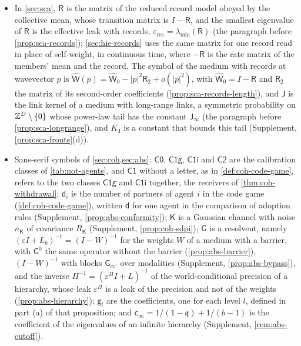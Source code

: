 \begin{itemize}
\item In \cref{sec:sca}, $\mathsf R$ is the matrix of the reduced record model obeyed by the collective mean, whose transition matrix is $I-\mathsf R$, and the smallest eigenvalue of $\mathsf R$ is the effective leak with records, $\varepsilon_{\mathrm{rec}}=\lambda_{\min}(\mathsf R)$ (the paragraph before \cref{prop:sca-records}); \cref{sec:hie-records} uses the same matrix for one record read in place of self-weight, in continuous time, where $-\mathsf R$ is the rate matrix of the members' mean and the record. The symbol of the medium with records at wavevector $p$ is $\hat{\mathsf W}(p)=\hat{\mathsf W}_0-\lvert p\rvert^2\mathsf R_2+o(\lvert p\rvert^2)$, with $\hat{\mathsf W}_0=I-\mathsf R$ and $\mathsf R_2$ the matrix of its second-order coefficients (\cref{prop:sca-records-length}), and $\mathsf J$ is the link kernel of a medium with long-range links, a symmetric probability on $\mathbb{Z}^D\setminus\{0\}$ whose power-law tail has the constant $\mathsf J_\infty$ (the paragraph before \cref{prop:sca-longrange}), and $K_{\mathsf J}$ is a constant that bounds this tail (Supplement, \cref{prop:sca-fronts}(d)).
\item Sans-serif symbols of \cref{sec:coh,sec:abs}: $\mathsf{C0}$, $\mathsf{C1g}$, $\mathsf{C1i}$ and $\mathsf{C2}$ are the calibration classes of \cref{tab:not-agents}, and $\mathsf{C1}$ without a letter, as in \cref{def:coh-code-game}, refers to the two classes $\mathsf{C1g}$ and $\mathsf{C1i}$ together, the receivers of \cref{thm:coh-withdrawal}; $\mathsf d_i$ is the number of partners of agent $i$ in the code game (\cref{def:coh-code-game}), written $\mathsf d$ for one agent in the comparison of adoption rules (Supplement, \cref{prop:abs-conformity}); $\mathsf K$ is a Gaussian channel with noise $n_{\mathsf K}$ of covariance $R_{\mathsf K}$ (Supplement, \cref{prop:coh-sdpi}); $\mathsf G$ is a resolvent, namely $(\varepsilon I+L_b)^{-1}=(I-W)^{-1}$ for the weights $W$ of a medium with a barrier, with $\mathsf G^0$ the same operator without the barrier (\cref{prop:abs-barrier}), $(I-W)^{-1}$ with blocks $\mathsf G_{cc'}$ over modalities (Supplement, \cref{prop:abs-bypass}), and the inverse $\Pi^{-1}=(\varepsilon^\Pi I+L)^{-1}$ of the world-conditional precision of a hierarchy, whose leak $\varepsilon^\Pi$ is a leak of the precision and not of the weights (\cref{prop:abs-hierarchy}); $\mathsf g_l$ are the coefficients, one for each level $l$, defined in part (a) of that proposition; and $\mathsf c_\infty=1/(1-\mathfrak q)+1/(b-1)$ is the coefficient of the eigenvalues of an infinite hierarchy (Supplement, \cref{rem:abs-cutoff}).

\end{itemize}
